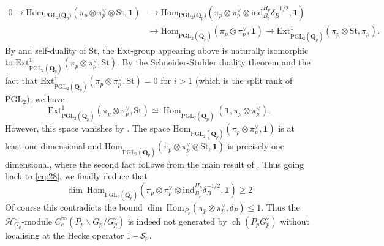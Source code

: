 \documentclass{amsart}%
\theoremstyle{plain}
\newcommand\scalemath[2]{\scalebox{#1}{\mbox{\ensuremath{\displaystyle #2}}}}
\theoremstyle{plain}
\theoremstyle{remark}
\DeclareMathOperator{\ch}{ch}
\DeclareMathOperator{\Hom}{Hom}
\begin{document}
        \begin{align}\label{eq:28}0\longrightarrow \mathrm{Hom}_{\mathrm{PGL_2(\mathbf{Q}_p})}\left(\pi_p\otimes\pi_p^\vee\otimes \mathrm{St},\mathbf{1}\right)&\longrightarrow\mathrm{Hom}_{\mathrm{PGL_2(\mathbf{Q}_p})}\left(\pi_p\otimes \pi_p^\vee\otimes \mathrm{ind}_{B_p}^{H_p}\delta_B^{-1/2},\mathbf{1}\right)\\
        \nonumber&\longrightarrow \mathrm{Hom}_{\mathrm{PGL}_2(\mathbf{Q}_p)}\left(\pi_p\otimes \pi_p^\vee,\mathbf{1}\right)\longrightarrow \mathrm{Ext}_{\mathrm{PGL}_2(\mathbf{Q}_p)}^{1}\left(\pi_p\otimes \mathrm{St},\pi_p\right).
        \end{align}
       By \cite[Proposition $2.6$]{Prasad2018ExtICM} and self-duality of $\mathrm{St}$, the $\mathrm{Ext}$-group appearing above is naturally isomorphic to $\mathrm{Ext}_{\mathrm{PGL}_2(\mathbf{Q}_p)}^{1}\left(\pi_p\otimes \pi_p^\vee,\mathrm{St}\right)$. By the Schneider-Stuhler duality theorem \cite[Theorem $8.1$]{Prasad2018ExtICM} and the fact that $\mathrm{Ext}_{\mathrm{PGL}_2(\mathbf{Q}_p)}^{i}\left(\pi_p\otimes \pi_p^\vee,\mathrm{St}\right)=0$ for $i>1$ (which is the split rank of $\mathrm{PGL_2})$, we have
       $$\mathrm{Ext}_{\mathrm{PGL}_2(\mathbf{Q}_p)}^{1}\left(\pi_p\otimes \pi_p^\vee,\mathrm{St}\right)\simeq \Hom_{\mathrm{PGL}_2(\mathbf{Q}_p)}\left(\mathbf{1},\pi_p\otimes \pi_p^\vee\right).$$
       However, this space vanishes by \cite[Proposition $8.1$]{Prasad2018ExtICM}. The space $
           \mathrm{Hom}_{\mathrm{PGL}_2(\mathbf{Q}_p)}\left(\pi_p\otimes \pi_p^\vee,\mathbf{1}\right)$ is at least one dimensional and $
           \mathrm{Hom}_{\mathrm{PGL}_2(\mathbf{Q}_p)}\left(\pi_p\otimes \pi_p^\vee\otimes \mathrm{St},\mathbf{1}\right)$ is precisely one dimensional,
       where the second fact follows from the main result of \cite{prasad1990trilinear}. Thus going back to \eqref{eq:28}, we finally deduce that 
       $$\dim\ \mathrm{Hom}_{\mathrm{PGL}_2(\mathbf{Q}_p)}\left(\pi_p\otimes \pi_p^\vee\otimes \mathrm{ind}_{B_p}^{H_p}\delta_B^{-1/2},\mathbf{1}\right)\geq 2$$
       Of course this contradicts the bound $\dim\ \mathrm{Hom}_{P_p}\left(\pi_p\otimes \pi_p^\vee,\delta_P\right)\leq 1$. Thus the $\mathcal{H}_{G_p}^\circ$-module $C_c^\infty(P_p\backslash G_p/G_p^\circ)$ is indeed not generated by $\ch(P_pG_p^\circ)$ without localising at the Hecke operator $\scalemath{0.9}{1-\mathcal{S}_p}$.
\end{document}
